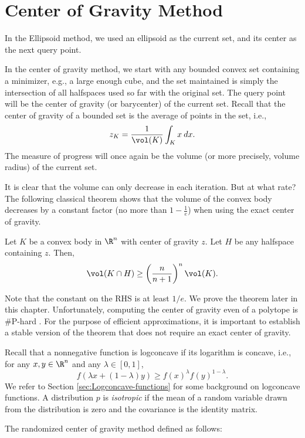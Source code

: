 \section{Center of Gravity Method}

In the Ellipsoid method, we used an ellipsoid as the current set,
and its center as the next query point.

In the center of gravity method, we start with any bounded convex
set containing a minimizer, e.g., a large enough cube, and the set
maintained is simply the intersection of all halfspaces used so far
with the original set. The query point will be the center of gravity
(or barycenter) of the current set. Recall that the center of gravity
of a bounded set is the average of points in the set, i.e., 
\[
z_{K}=\frac{1}{\vol(K)}\int_{K}x\:dx.
\]
The measure of progress will once again be the volume (or more precisely,
volume radius) of the current set.

It is clear that the volume can only decrease in each iteration. But
at what rate? The following classical theorem shows that the volume
of the convex body decreases by a constant factor (no more than $1-\frac{1}{e}$)
when using the exact center of gravity.
\begin{thm}
\label{thm:Grunbaum}\cite{Grunbaum1960}Let $K$ be a convex body
in $\R^{n}$ with center of gravity $z$. Let $H$ be any halfspace
containing $z$. Then, 
\[
\vol(K\cap H)\ge\left(\frac{n}{n+1}\right)^{n}\vol(K).
\]
\end{thm}

Note that the constant on the RHS is at least $1/e$. We prove the
theorem later in this chapter. Unfortunately, computing the center
of gravity even of a polytope is \#P-hard \cite{rademacher2007approximating}.
For the purpose of efficient approximations, it is important to establish
a stable version of the theorem that does not require an exact center
of gravity.

Recall that a nonnegative function is logconcave if its logarithm
is concave, i.e., for any $x,y\in\R^{n}$ and any $\lambda\in[0,1]$,
\[
f(\lambda x+(1-\lambda)y)\ge f(x)^{\lambda}f(y)^{1-\lambda}.
\]
We refer to Section \ref{sec:Logconcave-functions} for some background
on logconcave functions. A distribution $p$ is \emph{isotropic} if
the mean of a random variable drawn from the distribution is zero
and the covariance is the identity matrix.

The randomized center of gravity method defined as follows: 

